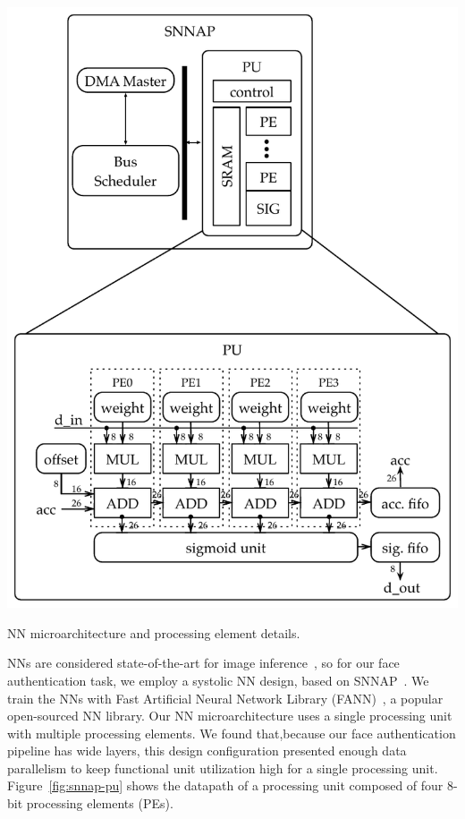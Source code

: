 \begin{marginfigure}
  \includegraphics[width=\textwidth]{nsp-figs/snnap_pu_new.pdf}
  \caption{NN microarchitecture and processing element details.}
  \label{fig:snnap-pu}
\end{marginfigure}

NNs are considered state-of-the-art for image inference~\cite{amos2016openface}, so for our face authentication task, we employ a systolic NN design, based on SNNAP~\cite{snnap,moreau-bitwidth}.
We train the NNs with Fast Artificial Neural Network Library (FANN)~\cite{fann}, a popular open-sourced NN library.
Our NN microarchitecture uses a single processing unit with multiple processing elements.
We found that,because our face authentication pipeline has wide layers, this design configuration presented enough data parallelism to keep functional unit utilization high for a single processing unit.
Figure~\ref{fig:snnap-pu} shows the datapath of a processing unit composed of four 8-bit processing elements (PEs).

